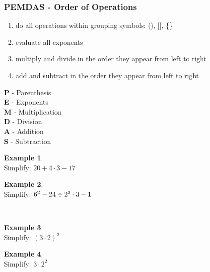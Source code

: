 \documentclass[addpoints,12pt]{exam}
\theoremstyle{definition}
\newtheorem{example}{Example}[subsection]
\begin{document}
\newpage

\subsubsection*{PEMDAS - Order of Operations}

\begin{minipage}{.65\textwidth}
\begin{enumerate}
\item do all operations within grouping symbols: (), [], \{\}
\item evaluate all exponents
\item multiply and divide in the order they appear from left to right
\item add and subtract in the order they appear from left to right
\end{enumerate}
\end{minipage}%
\begin{minipage}{.1\textwidth}
\;
\end{minipage}%
\begin{minipage}{.25\textwidth}
\begin{mdframed}
\textbf{P} - Parenthesis\\
\textbf{E} - Exponents\\
\textbf{M} - Multiplication\\
\textbf{D} - Division\\
\textbf{A} - Addition\\
\textbf{S} - Subtraction
\end{mdframed}
\end{minipage}%

\vspace{.5in}
\noindent
\begin{minipage}{.5\textwidth}
\begin{example}\mbox{}\\
Simplify: $20 + 4\cdot 3 - 17$
\vspace{1.75in}
\end{example}
\end{minipage}%
\begin{minipage}{.5\textwidth}
\begin{example}\mbox{}\\
Simplify: $6^2 - 24 \divisionsymbol 2^3\cdot 3 - 1$
\vspace{1.75in}
\end{example}
\end{minipage}%
\\
\begin{minipage}{.5\textwidth}
\begin{example}\mbox{}\\
Simplify: $(3\cdot 2)^2$
\vspace{1.25in}
\end{example}
\end{minipage}%
\begin{minipage}{.5\textwidth}
\begin{example}\mbox{}\\
Simplify: $3\cdot 2^2$
\vspace{1.25in}
\end{example}
\end{minipage}%
\\
\end{document}
